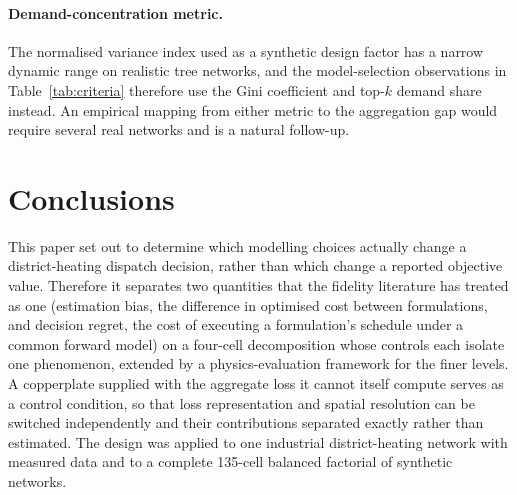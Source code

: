 \documentclass[a4paper,fleqn]{cas-sc}
\begin{document}
\paragraph{Demand-concentration metric.}
The normalised variance index used as a synthetic design factor has a narrow dynamic range
on realistic tree networks, and the model-selection observations in
Table~\ref{tab:criteria} therefore use the Gini coefficient and top-$k$ demand share
instead. An empirical mapping from either metric to the aggregation gap would require
several real networks and is a natural follow-up.

\section{Conclusions}\label{sec:conclusion}

This paper set out to determine which modelling choices actually change a district-heating
dispatch decision, rather than which change a reported objective value. Therefore it
separates two quantities that the fidelity literature has treated as one (estimation
bias, the difference in optimised cost between formulations, and decision regret, the cost
of executing a formulation's schedule under a common forward model) on a four-cell
decomposition whose controls each isolate one phenomenon, extended by a physics-evaluation
framework for the finer levels. A copperplate supplied with the
aggregate loss it cannot itself compute serves as a control condition, so that loss
representation and spatial resolution can be switched independently and their contributions
separated exactly rather than estimated. The design was applied to one industrial district-heating network
with measured data and to a complete 135-cell balanced factorial of synthetic networks.
\end{document}
